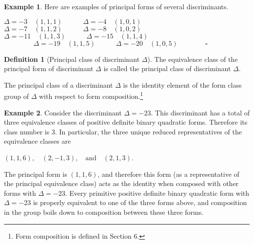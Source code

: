 \documentclass{article}
\theoremstyle{definition}
\newtheorem{definition}{Definition}[section]
\theoremstyle{theorem}
\theoremstyle{example}
\newtheorem{example}{Example}[section]
\theoremstyle{corollary}
\begin{document}
\bigskip

\theoremstyle{example}
\begin{example}
Here are examples of principal forms of several discriminants.
\begin{center}
\(\Delta = -3 \quad (1, 1, 1) \quad \quad \quad \Delta = -4 \quad (1, 0, 1)\) \\
\(\Delta = -7 \quad (1, 1, 2) \quad \quad \quad \Delta = -8 \quad (1, 0, 2)\) \\
\(\Delta = -11 \quad (1, 1, 3) \quad \quad \quad \Delta = -15 \quad (1, 1, 4)\) \\
\(\phantom{\quad \quad \quad \quad \square} \Delta = -19 \quad (1, 1, 5) \quad \quad \quad \Delta = -20 \quad (1, 0, 5) \quad \quad \quad \quad \square\)
\end{center}
\end{example}

\bigskip

\theoremstyle{definition}
\begin{definition}[Principal class of discriminant \(\Delta\)]
The equivalence class of the principal form of discriminant \(\Delta\) is called the principal class of discriminant \(\Delta\).
\end{definition}

\bigskip

The principal class of a discriminant \(\Delta\) is the identity element of the form class group of \(\Delta\) with respect to form composition.\footnote{Form composition is defined in Section 6.}

\bigskip

\theoremstyle{example}
\begin{example}
Consider the discriminant \(\Delta = -23\). This discriminant has a total of three equivalence classes of positive definite binary quadratic forms. Therefore its class number is 3. In particular, the three unique reduced representatives of the equivalence classes are
\begin{center}
\((1, 1, 6), \quad (2, -1, 3), \quad \textrm{and} \quad (2, 1, 3)\).
\end{center}
The principal form is \((1, 1, 6)\), and therefore this form (as a representative of the principal equivalence class) acts as the identity when composed with other forms with \(\Delta = -23\). Every primitive positive definite binary quadratic form with \(\Delta = -23\) is properly equivalent to one of the three forms above, and composition in the group boils down to composition between these three forms. \square
\end{example}
\end{document}
